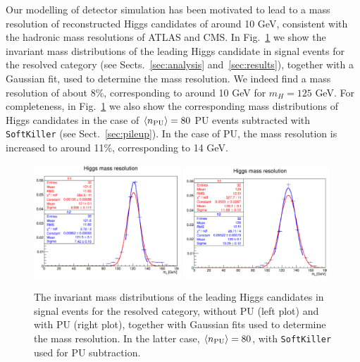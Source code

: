 Our modelling of detector simulation has been motivated
to lead to a mass resolution of
reconstructed Higgs candidates of around 10 GeV, consistent
with the hadronic mass resolutions of ATLAS and CMS.
%
In  Fig.~\ref{fig:higgs-mass-resolution} we show the
invariant mass distributions of the leading
Higgs candidate in signal events for the
resolved category (see Sects.~\ref{sec:analysis}
and~\ref{sec:results}), together with
a Gaussian fit,
used to determine the mass resolution.
%
We indeed  find a mass resolution of about 8\%, corresponding
    to around 10 GeV for $m_H=125$ GeV.
%
    For completeness, in Fig.~\ref{fig:higgs-mass-resolution}
    we also show the corresponding
    mass distributions of Higgs candidates
    in the case of $\left\langle n_{\rm PU}\right\rangle=80$ PU events
    subtracted with {\tt SoftKiller} (see Sect.~\ref{sec:pileup}).
    In the case of PU, the mass resolution is increased to around 11\%, corresponding to
    14 GeV.
        
\begin{figure}[t]
  \begin{center}
    \vspace{-1cm}
  \includegraphics[width=0.49\textwidth]{plots/higgs_mass_res_noPU.pdf}
  \includegraphics[width=0.49\textwidth]{plots/higgs_mass_res_PU80.pdf}
  \caption{\small The invariant mass distributions of the leading
    Higgs candidates in signal events for the resolved category, without
    PU (left plot) and with PU (right plot),
    together with Gaussian fits  used to determine the mass resolution.
    In the latter case, $\left\langle n_{\rm PU}\right\rangle=80$, with {\tt SoftKiller}
     used for PU subtraction.
}
\label{fig:higgs-mass-resolution}
\end{center}
\end{figure}





